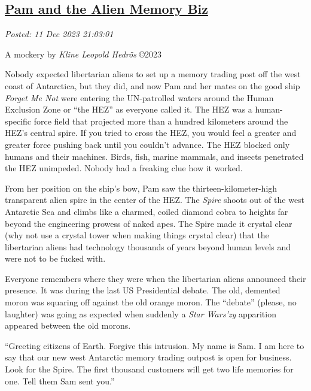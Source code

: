 %

\subsection*{\href{http://analyzethedatanotthedrivel.org/2023/12/11/pam-and-the-alien-memory-biz/}{Pam and the Alien Memory Biz}}


\noindent\emph{Posted: 11 Dec 2023 21:03:01}
\vspace{6pt}

A mockery by \emph{Kline Leopold Hedrös} ©2023

Nobody expected libertarian aliens to set up a memory trading post off
the west coast of Antarctica, but they did, and now Pam and her mates on
the good ship \emph{Forget Me Not} were entering the UN-patrolled waters
around the Human Exclusion Zone or ``the HEZ'' as everyone called it.
The HEZ was a human-specific force field that projected more than a
hundred kilometers around the HEZ's central spire. If you tried to cross
the HEZ, you would feel a greater and greater force pushing back until
you couldn't advance. The HEZ blocked only humans and their machines.
Birds, fish, marine mammals, and insects penetrated the HEZ unimpeded.
Nobody had a freaking clue how it worked.

From her position on the ship's bow, Pam saw the thirteen-kilometer-high
transparent alien spire in the center of the HEZ. The \emph{Spire}
shoots out of the west Antarctic Sea and climbs like a charmed, coiled
diamond cobra to heights far beyond the engineering prowess of naked
apes. The Spire made it crystal clear (why not use a crystal tower when
making things crystal clear) that the libertarian aliens had technology
thousands of years beyond human levels and were not to be fucked with.

Everyone remembers where they were when the libertarian aliens announced
their presence. It was during the last US Presidential debate. The old,
demented moron was squaring off against the old orange moron. The
``debate'' (please, no laughter) was going as expected when suddenly a
\emph{Star Wars'zy} apparition appeared between the old morons.

``Greeting citizens of Earth. Forgive this intrusion. My name is Sam. I
am here to say that our new west Antarctic memory trading outpost is
open for business. Look for the Spire. The first thousand customers will
get two life memories for one. Tell them Sam sent you.''

